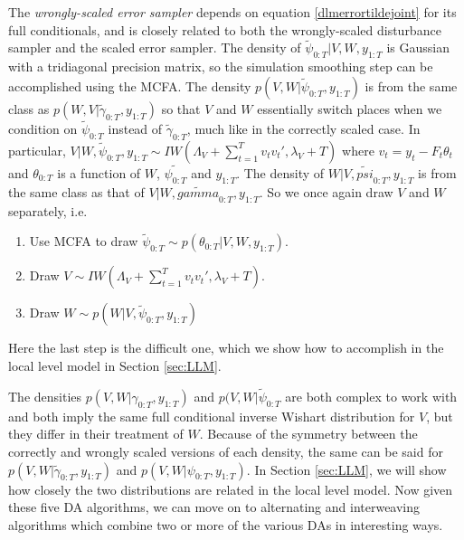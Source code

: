 \documentclass{article}
\begin{document}
The {\it wrongly-scaled error sampler} depends on equation \eqref{dlmerrortildejoint} for its full conditionals, and is closely related to both the wrongly-scaled disturbance sampler and the scaled error sampler. The density of $\tilde{\psi}_{0:T}|V,W,y_{1:T}$ is Gaussian with a tridiagonal precision matrix, so the simulation smoothing step can be accomplished using the MCFA. The density $p(V,W|\tilde{\psi}_{0:T},y_{1:T})$ is from the same class as $p(W,V|\tilde{\gamma}_{0:T},y_{1:T})$ so that $V$ and $W$ essentially switch places when we condition on $\tilde{\psi}_{0:T}$ instead of $\tilde{\gamma}_{0:T}$, much like in the correctly scaled case. In particular, $V|W,\tilde{\psi}_{0:T},y_{1:T} \sim IW\left(\Lambda_V + \sum_{t=1}^Tv_tv_t',\lambda_V + T\right)$ where $v_t = y_t - F_t\theta_t$ and $\theta_{0:T}$ is a function of $W$, $\tilde{\psi_{0:T}}$ and $y_{1:T}$. The density of $W|V,\tilde{psi}_{0:T},y_{1:T}$ is from the same class as that of $V|W,\tilde{gamma}_{0:T},y_{1:T}$. So we once again draw $V$ and $W$ separately, i.e. 
\begin{enumerate}
\item Use MCFA to draw $\tilde{\psi}_{0:T} \sim p(\theta_{0:T}|V,W,y_{1:T})$.
\item Draw $V \sim IW\left(\Lambda_V + \sum_{t=1}^Tv_tv_t',\lambda_V + T\right)$.
\item Draw $W \sim p(W|V,\tilde{\psi}_{0:T},y_{1:T})$
\end{enumerate}
Here the last step is the difficult one, which we show how to accomplish in the local level model in Section \ref{sec:LLM}.

The densities $p(V,W|\gamma_{0:T},y_{1:T})$ and $p(V,W|\tilde{\psi}_{0:T}$ are both complex to work with and both imply the same full conditional inverse Wishart distribution for $V$, but they differ in their treatment of $W$. Because of the symmetry between the correctly and wrongly scaled versions of each density, the same can be said for $p(V,W|\tilde{\gamma}_{0:T},y_{1:T})$ and $p(V,W|\psi_{0:T},y_{1:T})$. In Section \ref{sec:LLM}, we will show how closely the two distributions are related in the local level model. Now given these five DA algorithms, we can move on to alternating and interweaving algorithms which combine two or more of the various DAs in interesting ways.
\end{document}

